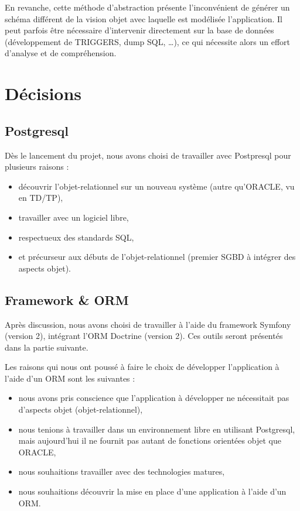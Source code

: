 En revanche, cette méthode d'abstraction présente l'inconvénient de générer un schéma différent de la vision objet avec laquelle est modélisée l'application. Il peut parfois être nécessaire d'intervenir directement sur la base de données (développement de TRIGGERS, dump SQL, \ldots), ce qui nécessite alors un effort d'analyse et de compréhension.

\section{Décisions}

\subsection{Postgresql}

Dès le lancement du projet, nous avons choisi de travailler avec Postpresql pour plusieurs raisons :
\begin{itemize}
\item découvrir l'objet-relationnel sur un nouveau système (autre qu'ORACLE, vu en TD/TP),
\item travailler avec un logiciel libre,
\item respectueux des standards SQL,
\item et précurseur aux débuts de l'objet-relationnel (premier SGBD à intégrer des aspects objet).
\end{itemize}

\subsection{Framework \& ORM}

Après discussion, nous avons choisi de travailler à l'aide du framework Symfony (version 2), intégrant l'ORM Doctrine (version 2). Ces outils seront présentés dans la partie suivante.

Les raisons qui nous ont poussé à faire le choix de développer l'application à l'aide d'un ORM sont les suivantes :
\begin{itemize}
\item nous avons pris conscience que l'application à développer ne nécessitait pas d'aspects objet (objet-relationnel),
\item nous tenions à travailler dans un environnement libre en utilisant Postgresql, mais aujourd'hui il ne fournit pas autant de fonctions orientées objet que ORACLE,
\item nous souhaitions travailler avec des technologies matures,
\item nous souhaitions découvrir la mise en place d'une application à l'aide d'un ORM.
\end{itemize}
	
